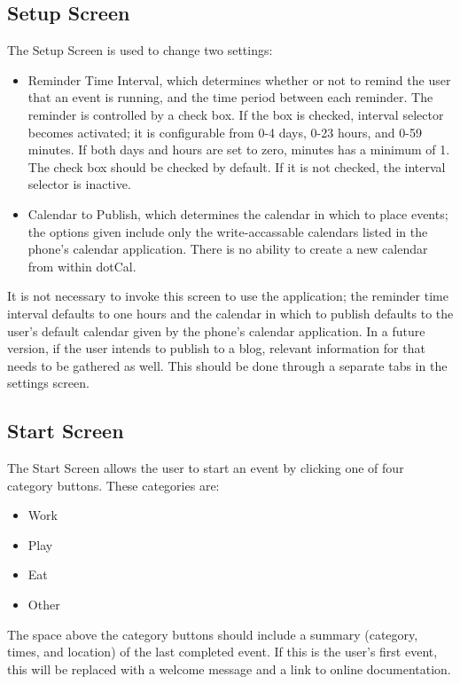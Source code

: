 \documentclass[11pt]{article}
\begin{document}
\subsection{Setup Screen} 

The Setup Screen is used to change two settings:

\begin{itemize}
	\item{Reminder Time Interval, which determines whether or not to remind the user that an event is running, and the time period between each reminder. The reminder is controlled by a check box. If the box is checked, interval selector becomes activated; it is configurable from 0-4 days, 0-23 hours, and 0-59 minutes. If both days and hours are set to zero, minutes has a minimum of 1. The check box should be checked by default. If it is not checked, the interval selector is inactive.}
	\item{Calendar to Publish, which determines the calendar in which to place events; the options given include only the write-accassable calendars listed in the phone's calendar application. There is no ability to create a new calendar from within dotCal.}
\end{itemize}

It is not necessary to invoke this screen to use the application; the reminder time interval defaults to one hours and the calendar in which to publish defaults to the user's default calendar given by the phone's calendar application. In a future version, if the user intends to publish to a blog, relevant information for that needs to be gathered as well. This should be done through a separate tabs in the settings screen. 


\subsection{Start Screen}

The Start Screen allows the user to start an event by clicking one of four category buttons. These categories are:

\begin{itemize}
	\item{Work} 
	\item{Play}
	\item{Eat}
	\item{Other}
\end{itemize}

The space above the category buttons should include a summary (category, times, and location) of the last completed event. If this is the user's first event, this will be replaced with a welcome message and a link to online documentation.
\end{document}
